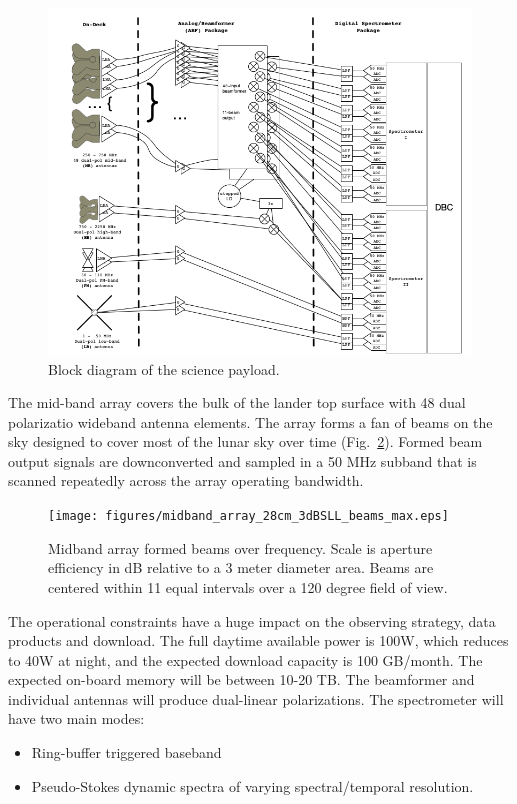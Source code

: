 \begin{figure}
	\centering
	\includegraphics[width=\linewidth]{figures/SciencePayload.png}
	\caption{Block diagram of the science payload.\label{fig:block}}
\end{figure}

The mid-band array covers the bulk of the lander top surface with 48 dual polarizatio wideband antenna elements. The array forms a fan of beams on the sky designed to cover most of the lunar sky over time (Fig.\ \ref{fig:midband_beam_maps}). Formed beam output signals are downconverted and sampled in a 50 MHz subband that is scanned repeatedly across the array operating bandwidth. 

\begin{figure}
	\centering
	\texttt{[image: figures/midband\_array\_28cm\_3dBSLL\_beams\_max.eps]}
	\caption{Midband array formed beams over frequency. Scale is aperture efficiency in dB relative to a 3 meter diameter area. Beams are centered within 11 equal intervals over a 120 degree field of view.}
	\label{fig:midband_beam_maps}
\end{figure}


The operational constraints have a huge impact on the observing strategy, data products and download.  The full daytime available power is 100W, which reduces to 40W at night, and the expected download capacity is 100 GB/month.  The expected on-board memory will be between 10-20 TB.  The beamformer and individual antennas will produce dual-linear polarizations.  The spectrometer will have two main modes:
\begin{itemize}[noitemsep]
    \item Ring-buffer triggered baseband
    \item Pseudo-Stokes dynamic spectra of varying spectral/temporal resolution.
\end{itemize}

